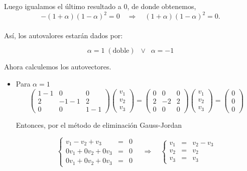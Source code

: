 \begin{enumerate}
    Luego igualamos el último resultado a $0$, de donde obtenemos,\\
    $$-(1+\alpha)\left(1-\alpha\right)^2=0\quad \Rightarrow \quad (1+\alpha)\left(1-\alpha\right)^2=0.$$\\
    Así, los autovalores estarán dados por:
    \begin{tcolorbox}
	$$\alpha=1\; (\mbox{doble})  \;\;\lor\;\; \alpha=-1$$
    \end{tcolorbox}
    \vspace*{.2cm}

    Ahora calculemos los autovectores.

    \begin{itemize}

	\item Para $\alpha=1$
	    $$
	    \left(\begin{array}{*{3}{c}}
		1-1 & 0 & 0\\
		2 & -1-1 & 2 \\
		0 & 0 & 1-1
	    \end{array}\right) 
	    \left(\begin{array}{*{3}{c}}
		v_1 \\
		v_2 \\
		v_3
	    \end{array}\right) = 
	    \left(\begin{array}{*{3}{c}}
		0 & 0 & 0 \\
		2 & -2 & 2 \\
		0 & 0 & 0
	    \end{array}\right)
	    \left(\begin{array}{*{3}{c}}
		v_1 \\
		v_2 \\
		v_3
	    \end{array}\right) = 
	    \left(\begin{array}{*{3}{c}}
		0 \\
		0 \\
		0	
	    \end{array}\right) 
	    $$

	    Entonces, por el método de eliminación Gauss-Jordan

	    $$\left\{\begin{array}{rcl}
		v_1-v_2+v_3 &=& 0\\
		0v_1+0v_2+0v_3 &=& 0\\
		0v_1+0v_2+0v_3 &=& 0
	    \end{array}\right.
	    \quad \Rightarrow \quad
	    \left\{\begin{array}{rcl}
		v_1 &=& v_2-v_3\\
		v_2 &=& v_2\\
		v_3 &=& v_3
	    \end{array}\right.$$


\end{itemize}
\end{enumerate}
